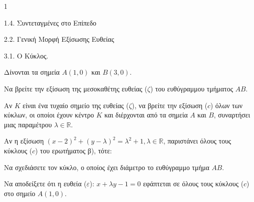 \begin{ylh}{1}
    \item 1.4. Συντεταγμένες στο Επίπεδο
    \item 2.2. Γενική Μορφή Εξίσωσης Ευθείας
    \item 3.1. Ο Κύκλος.
\end{ylh}
Δίνονται τα σημεία $A(1,0)$ και $B(3,0)$.
\begin{alist}
\item Να βρείτε την εξίσωση της μεσοκαθέτης ευθείας ($\zeta$) του ευθύγραμμου τμήματος $AB$.  
\item Αν $K$ είναι ένα τυχαίο σημείο της ευθείας ($\zeta$), να βρείτε την εξίσωση ($c$) όλων των κύκλων, οι οποίοι έχουν κέντρο $K$ και διέρχονται από τα σημεία $A$ και $B$, συναρτήσει μιας παραμέτρου $\lambda \in \mathbb{R}$.  
\item Αν η εξίσωση $(x - 2)^2 + (y - \lambda)^2 = \lambda^2 + 1, \lambda \in \mathbb{R}$, παριστάνει όλους τους κύκλους ($c$) του ερωτήματος β), τότε:
    \begin{rlist}
    \item Να σχεδιάσετε τον κύκλο, ο οποίος έχει διάμετρο το ευθύγραμμο τμήμα $AB$.  
    \item Να αποδείξετε ότι η ευθεία ($\varepsilon$): $x + \lambda y - 1 = 0$ εφάπτεται σε όλους τους κύκλους ($c$) στο σημείο $A(1,0)$.  
    \end{rlist}
\end{alist}